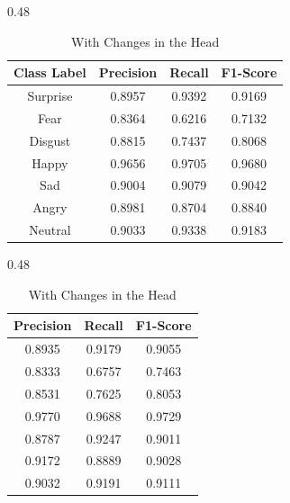 \begin{table}[H]
\centering
\caption{Comparison of Small Model Classification Results}
\label{tab:class_small_model_comparison}

\begin{subtable}{0.48\textwidth}
\centering
\small %
\caption{Without Changes in the Head}
\begin{tabular}{cccc}
\hline
\textbf{Class Label} & \textbf{Precision} & \textbf{Recall} & \textbf{F1-Score} \\ \hline
Surprise  & 0.8957 & 0.9392 & 0.9169 \\
Fear      & 0.8364 & 0.6216 & 0.7132 \\
Disgust & 0.8815 & 0.7437 & 0.8068 \\
Happy     & 0.9656 & 0.9705 & 0.9680 \\
Sad       & 0.9004 & 0.9079 & 0.9042 \\
Angry     & 0.8981 & 0.8704 & 0.8840 \\
Neutral   & 0.9033 & 0.9338 & 0.9183 \\
\hline
\end{tabular}
\end{subtable}
\hfill
\begin{subtable}{0.48\textwidth}
\centering
\small
\caption{With Changes in the Head}
\begin{tabular}{ccc}
\hline
\textbf{Precision} & \textbf{Recall} & \textbf{F1-Score} \\ \hline
0.8935 & 0.9179 & 0.9055 \\
0.8333 & 0.6757 & 0.7463 \\
0.8531 & 0.7625 & 0.8053 \\
0.9770 & 0.9688 & 0.9729 \\
0.8787 & 0.9247 & 0.9011 \\
0.9172 & 0.8889 & 0.9028 \\
0.9032 & 0.9191 & 0.9111 \\
\hline
\end{tabular}
\end{subtable}

\end{table}


